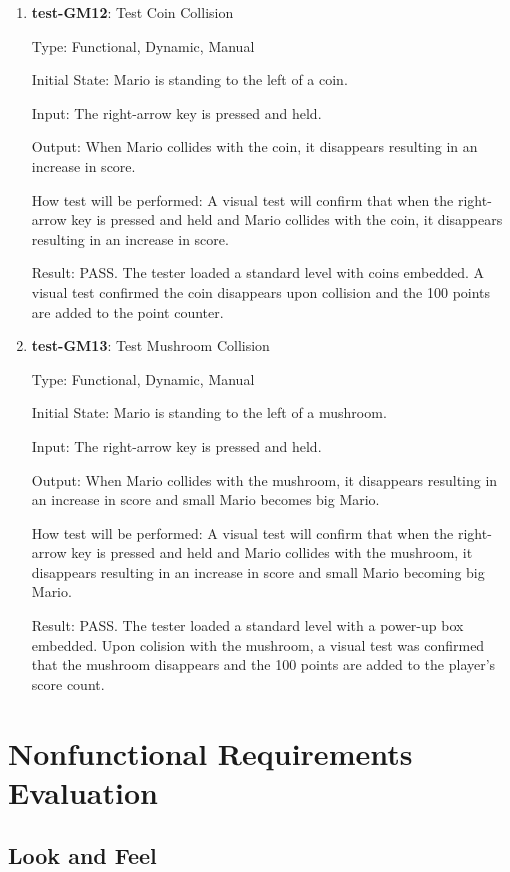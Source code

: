 \documentclass[12pt, titlepage]{article}
\begin{document}
\begin{enumerate}
\item{\textbf{test-GM12}: Test Coin Collision\\}

Type: Functional, Dynamic, Manual

Initial State: Mario is standing to the left of a coin.
					
Input: The right-arrow key is pressed and held.
					
Output: When Mario collides with the coin, it disappears resulting in an increase in score.
					
How test will be performed: A visual test will confirm that when the right-arrow key is pressed and held and Mario collides with the coin, it disappears resulting in an increase in score.

Result: PASS. The tester loaded a standard level with coins embedded. A visual test confirmed the coin disappears upon collision and the 100 points are added to the point counter.

\item{\textbf{test-GM13}: Test Mushroom Collision\\}

Type: Functional, Dynamic, Manual

Initial State: Mario is standing to the left of a mushroom.
					
Input: The right-arrow key is pressed and held.
					
Output: When Mario collides with the mushroom, it disappears resulting in an increase in score and small Mario becomes big Mario.
					
How test will be performed: A visual test will confirm that when the right-arrow key is pressed and held and Mario collides with the mushroom, it disappears resulting in an increase in score and small Mario becoming big Mario.

Result: PASS. The tester loaded a standard level with a power-up box embedded. Upon colision with the mushroom, a visual test was confirmed that the mushroom disappears and the 100 points are added to the player's score count. 

\end{enumerate}

\section{Nonfunctional Requirements Evaluation}

\subsection{Look and Feel}
\end{document}
